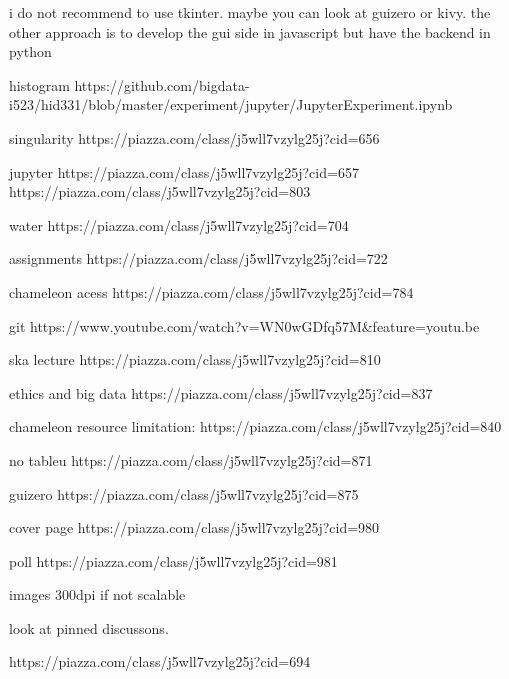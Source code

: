 i do not recommend to use tkinter. maybe you can look at guizero or kivy. the other approach is to develop the gui side in javascript but have the backend in python

histogram
https://github.com/bigdata-i523/hid331/blob/master/experiment/jupyter/JupyterExperiment.ipynb

singularity
https://piazza.com/class/j5wll7vzylg25j?cid=656

jupyter
https://piazza.com/class/j5wll7vzylg25j?cid=657
https://piazza.com/class/j5wll7vzylg25j?cid=803

water
https://piazza.com/class/j5wll7vzylg25j?cid=704

assignments
https://piazza.com/class/j5wll7vzylg25j?cid=722

chameleon acess
https://piazza.com/class/j5wll7vzylg25j?cid=784

git
https://www.youtube.com/watch?v=WN0wGDfq57M&feature=youtu.be

ska lecture
https://piazza.com/class/j5wll7vzylg25j?cid=810

ethics and big data
https://piazza.com/class/j5wll7vzylg25j?cid=837

chameleon
resource limitation: https://piazza.com/class/j5wll7vzylg25j?cid=840

no tableu
https://piazza.com/class/j5wll7vzylg25j?cid=871

guizero
https://piazza.com/class/j5wll7vzylg25j?cid=875

cover page
https://piazza.com/class/j5wll7vzylg25j?cid=980

poll
https://piazza.com/class/j5wll7vzylg25j?cid=981

images 300dpi if not scalable

look at pinned discussons.

https://piazza.com/class/j5wll7vzylg25j?cid=694